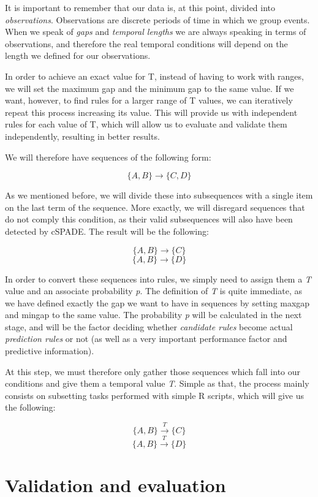 \documentclass[a4paper,12pt]{article}
\begin{document}
It is important to remember that our data is, at this point, divided into \emph{observations}. Observations are discrete periods of time in which we group events. When we speak of \emph{gaps} and \emph{temporal lengths} we are always speaking in terms of observations, and therefore the real temporal conditions will depend on the length we defined for our observations.

In order to achieve an exact value for T, instead of having to work with ranges, we will set the maximum gap and the minimum gap to the same value. If we want, however, to find rules for a larger range of T values, we can iteratively repeat this process increasing its value. This will provide us with independent rules for each value of T, which will allow us to evaluate and validate them independently, resulting in better results. 

We will therefore have sequences of the following form:

$$\{A, B\} \longrightarrow \{C, D\}$$

As we mentioned before, we will divide these into subsequences with a single item on the last term of the sequence. More exactly, we will disregard sequences that do not comply this condition, as their valid subsequences will also have been detected by cSPADE. The result will be the following:

$$\{A, B\} \longrightarrow \{C\}$$
$$\{A, B\} \longrightarrow \{D\}$$

In order to convert these sequences into rules, we simply need to assign them a \emph{T} value and an associate probability \emph{p}. The definition of \emph{T} is quite immediate, as we have defined exactly the gap we want to have in sequences by setting maxgap and mingap to the same value. The probability \emph{p} will be calculated in the next stage, and will be the factor deciding whether \emph{candidate rules} become actual \emph{prediction rules} or not (as well as a very important performance factor and predictive information).

At this step, we must therefore only gather those sequences which fall into our conditions and give them a temporal value \emph{T}. Simple as that, the process mainly consists on subsetting tasks performed with simple R scripts, which will give us the following:

$$\{A, B\} \xrightarrow{T} \{C\}$$
$$\{A, B\} \xrightarrow{T} \{D\}$$


\section{Validation and evaluation} \label{sec:validation_evaluation}
\end{document}
